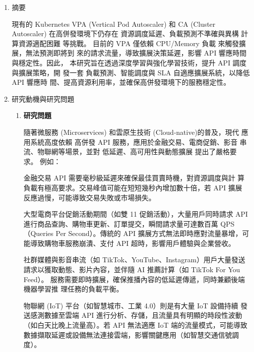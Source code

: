 \documentclass[12pt,a4paper]{article}
\begin{document}
\setlength{\parindent}{2em}


\begin{enumerate}[label={(\zhdig*)}, leftmargin=2\parindent, listparindent=\parindent]

\item 摘要

    現有的 Kubernetes VPA (Vertical Pod Autoscaler) 和 CA (Cluster
    Autoscaler) 在高併發環境下仍存在 資源調度延遲、負載預測不準確與異構
    計算資源適配困難 等挑戰。
    目前的 VPA 僅依賴 CPU/Memory 負載 來觸發擴展，無法預測即將到
    來的請求流量，導致擴展決策延遲，影響 API 響應時間與穩定性。因此，
    本研究旨在透過深度學習與強化學習技術，提升 API 調度與擴展策略，開
    發一套 負載預測、智能調度與 SLA 自適應擴展系統，以降低 API 響應時
    間、提高資源利用率，並確保高併發環境下的服務穩定性。

\item 研究動機與研究問題\label{研究動機}

\begin{enumerate}[label={(\arabic*)}, leftmargin=\parindent, listparindent=\parindent]

\item\textbf{研究問題}

    隨著微服務 (Microservices)
\cite{1}
和雲原生技術 (Cloud-native)\cite{2}的普及，現代
    應用系統高度依賴 高併發 API 服務，應用於金融交易、電商促銷、影音
    串流、物聯網等場景，並對 低延遲、高可用性與動態擴展 提出了嚴格要求。
    例如：

    金融交易 API 需要毫秒級延遲來確保最佳買賣時機，對資源調度與計
    算負載有極高要求。交易峰值可能在短短幾秒內增加數十倍，若 API 擴展
    反應過慢，可能導致交易失敗或市場損失。\cite{3}

    大型電商平台促銷活動期間（如雙 11 促銷活動），大量用戶同時請求
    API 進行商品查詢、購物車更新、訂單提交，瞬間請求量可達數百萬 QPS
    （Queries Per Second）。傳統的 API 擴展方式無法即時應對流量暴增，可
    能導致購物車服務崩潰、支付 API 超時，影響用戶體驗與企業營收。\cite{4}

    社群媒體與影音串流（如 TikTok、YouTube、Instagram）用戶大量發送
    請求以獲取動態、影片內容，並伴隨 AI 推薦計算（如 TikTok For You Feed）。
    服務需要即時擴展，確保推播內容的低延遲傳遞，同時兼顧後端機器學習推
    理任務的負載平衡。\cite{5}

    物聯網 (IoT) 平台（如智慧城市、工業 4.0）則是有大量 IoT 設備持續
    發送感測數據至雲端 API 進行分析、存儲，且流量具有明顯的時段性波動
    （如白天比晚上流量高）。若 API 無法適應 IoT 端的流量模式，可能導致
    數據擷取延遲或設備無法連接雲端，影響關鍵應用（如智慧交通信號調度）。
    \cite{6}


\end{enumerate}
\end{enumerate}
\end{document}
